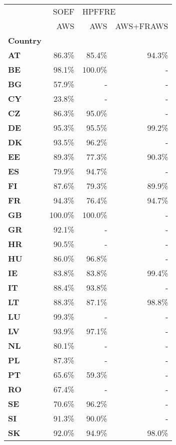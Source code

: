 \begin{tabular}{lr|rr}
\toprule
{} &    SOEF & \multicolumn{2}{l}{HPFFRE} \\
{} &     AWS &     AWS & AWS+FRAWS \\
\textbf{Country} &         &         &           \\
\midrule
\textbf{AT     } &   86.3\% &   85.4\% &     94.3\% \\
\textbf{BE     } &   98.1\% &  100.0\% &         - \\
\textbf{BG     } &   57.9\% &       - &         - \\
\textbf{CY     } &   23.8\% &       - &         - \\
\textbf{CZ     } &   86.3\% &   95.0\% &         - \\
\textbf{DE     } &   95.3\% &   95.5\% &     99.2\% \\
\textbf{DK     } &   93.5\% &   96.2\% &         - \\
\textbf{EE     } &   89.3\% &   77.3\% &     90.3\% \\
\textbf{ES     } &   79.9\% &   94.7\% &         - \\
\textbf{FI     } &   87.6\% &   79.3\% &     89.9\% \\
\textbf{FR     } &   94.3\% &   76.4\% &     94.7\% \\
\textbf{GB     } &  100.0\% &  100.0\% &         - \\
\textbf{GR     } &   92.1\% &       - &         - \\
\textbf{HR     } &   90.5\% &       - &         - \\
\textbf{HU     } &   86.0\% &   96.8\% &         - \\
\textbf{IE     } &   83.8\% &   83.8\% &     99.4\% \\
\textbf{IT     } &   88.4\% &   93.8\% &         - \\
\textbf{LT     } &   88.3\% &   87.1\% &     98.8\% \\
\textbf{LU     } &   99.3\% &       - &         - \\
\textbf{LV     } &   93.9\% &   97.1\% &         - \\
\textbf{NL     } &   80.1\% &       - &         - \\
\textbf{PL     } &   87.3\% &       - &         - \\
\textbf{PT     } &   65.6\% &   59.3\% &         - \\
\textbf{RO     } &   67.4\% &       - &         - \\
\textbf{SE     } &   70.6\% &   96.2\% &         - \\
\textbf{SI     } &   91.3\% &   90.0\% &         - \\
\textbf{SK     } &   92.0\% &   94.9\% &     98.0\% \\
\bottomrule
\end{tabular}
